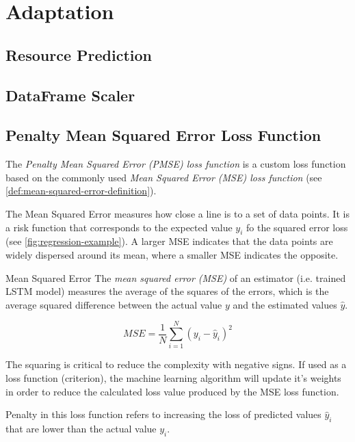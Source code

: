   

\section{Adaptation}
  \subsection{Resource Prediction}
  \subsection{DataFrame Scaler}
  \subsection{Penalty Mean Squared Error Loss Function}
  \label{sec:penalty-mse-loss-function-architecture-and-implementation}

    The \emph{Penalty Mean Squared Error (PMSE) loss function} is a custom loss function based on the commonly used \emph{Mean Squared Error (MSE) loss function} \cite{koksoyMultiresponseRobustDesign2006} (see \ref{def:mean-squared-error-definition}). 
    
    The Mean Squared Error measures how close a  line is to a set of data points. It is a risk function that corresponds to the expected value $y_i$ fo the squared error loss (see \ref{fig:regression-example}). A larger MSE indicates that the data points are widely dispersed around its mean, where a smaller MSE indicates the opposite.

    \begin{pabox}{Mean Squared Error}
    \label{def:mean-squared-error-definition}
      The \emph{mean squared error (MSE)} of an estimator (i.e. trained LSTM model) measures the average of the squares of the errors, which is the average squared difference between the actual value $y$ and the estimated values $\hat{y}$.

      $$MSE = \frac{1}{N} \sum_{i = 1}^{N}\left(y_i - \hat{y}_i\right)^2$$

      The squaring is critical to reduce the complexity with negative signs. If used as a loss function (criterion), the machine learning algorithm will update it's weights in order to reduce the calculated loss value produced by the MSE loss function.
    \end{pabox}

    Penalty in this loss function refers to increasing the loss of predicted values $\hat{y}_i$ that are lower than the actual value $y_i$.

